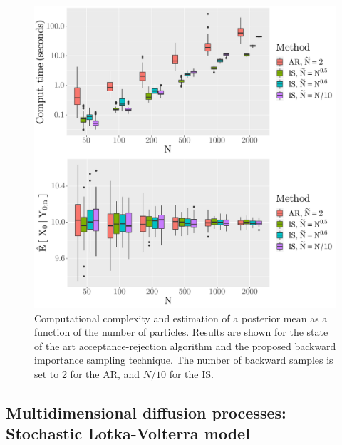 \documentclass{article}
\begin{document}
\begin{figure}[h]
\begin{center}
\includegraphics[scale = .4]{comparing_IS_AR_N_vary.pdf}
\end{center}
\caption{Computational complexity and estimation of a posterior mean as a function of the number of particles. Results are shown for the state of the art acceptance-rejection algorithm and the proposed backward  importance sampling technique. The number of backward samples is set to 2 for the AR, and $N/10$ for the IS.}
\label{fig:sine:timeandbias:N:vary}
\end{figure}

\subsection{Multidimensional diffusion processes: Stochastic Lotka-Volterra model}
\label{sec:simu:LV}
\end{document}
